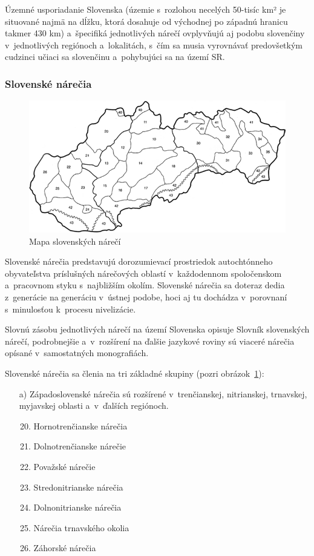 \begin{multicols}{2}
Územné usporiadanie Slovenska (územie s~rozlohou necelých 50-tisíc km² je situované najmä na dĺžku, ktorá dosahuje od východnej po západnú hranicu takmer 430 km) a~špecifiká jednotlivých nárečí ovplyvňujú aj podobu slovenčiny v~jednotlivých regiónoch a~lokalitách, s~čím sa musia vyrovnávať predovšetkým cudzinci učiaci sa slovenčinu a~pohybujúci sa na území SR.

\subsubsection{Slovenské nárečia}
\begin{figure}[ht]
\centering
\includegraphics[width=\textwidth]{dialects-map.png}
\caption{%
Mapa slovenských nárečí
}
\label{fig:dialects_sk}
\end{figure}

Slovenské nárečia predstavujú dorozumievací prostriedok autochtónneho obyvateľstva príslušných nárečových oblastí v~každodennom spoločenskom a~pracovnom styku s~najbližším okolím. Slovenské nárečia sa doteraz dedia z~generácie na generáciu v~ústnej podobe, hoci aj tu dochádza v~porovnaní s~minulosťou k~procesu nivelizácie.

Slovnú zásobu jednotlivých nárečí na území Slovenska opisuje Slovník slovenských nárečí, podrobnejšie a~v~rozšírení na ďalšie jazykové roviny sú viaceré nárečia opísané v~samostatných monografiách.

Slovenské nárečia sa členia na tri základné skupiny (pozri obrázok~\ref{fig:dialects_sk}):

\begin{itemize}
\item[a)] Západoslovenské nárečia sú rozšírené v~trenčianskej, nitrianskej, trnavskej, myjavskej oblasti a~v~ďalších regiónoch.

\begin{enumerate}
\setcounter{enumi}{19}
\item Hornotrenčianske nárečia
\item Dolnotrenčianske nárečie
\item Považské nárečie 
\item Stredonitrianske nárečia 
\item Dolnonitrianske nárečia 
\item Nárečia trnavského okolia
\item Záhorské nárečia 
\end{enumerate}


\end{itemize}
\end{multicols}
